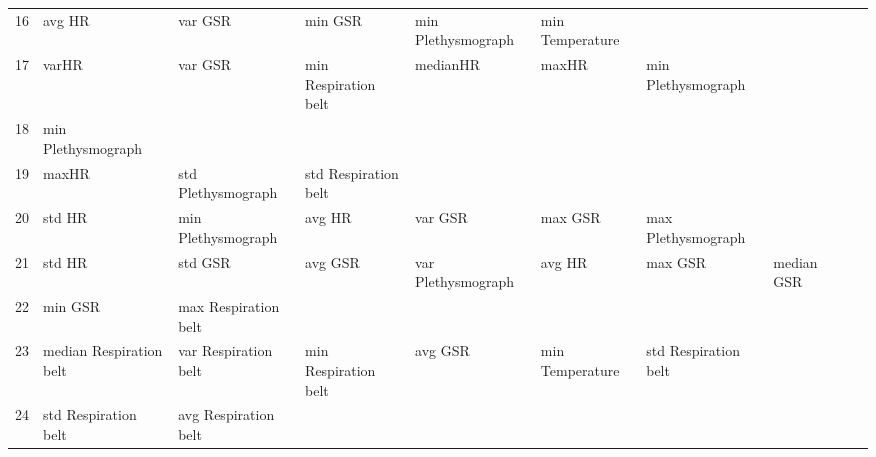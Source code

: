 \begin{landscape}
\begin{table}[]
\begin{tabular}{l|llllllll}
16       & avg HR                  & var GSR                 & min GSR                 & min Plethysmograph      & min Temperature         &                       &                         &                         &                         &         \\
17       & varHR                   & var GSR                 & min Respiration belt    & medianHR                & maxHR                   & min Plethysmograph    &                         &                         &                         &         \\
18       & min Plethysmograph      &                         &                         &                         &                         &                       &                         &                         &                         &         \\
19       & maxHR                   & std Plethysmograph      & std Respiration belt    &                         &                         &                       &                         &                         &                         &         \\
20       & std HR                  & min Plethysmograph      & avg HR                  & var GSR                 & max GSR                 & max Plethysmograph    &                         &                         &                         &         \\
21       & std HR                  & std GSR                 & avg GSR                 & var Plethysmograph      & avg HR                  & max GSR               & median GSR              &                         &                         &         \\
22       & min GSR                 & max Respiration belt    &                         &                         &                         &                       &                         &                         &                         &         \\
23       & median Respiration belt & var Respiration belt    & min Respiration belt    & avg GSR                 & min Temperature         & std Respiration belt  &                         &                         &                         &         \\
24       & std Respiration belt    & avg Respiration belt    &                         &                         &                         &                       &                         &                         &                         &         \\

\end{tabular}
\end{table}
\end{landscape}
